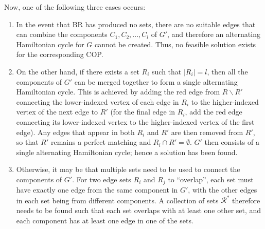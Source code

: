 \documentclass[runningheads]{llncs}
\begin{document}
Now, one of the following three cases occurs:
\begin{enumerate}
\item In the event that BR has produced no sets, there are no suitable edges that can combine the components $C_1, C_2, ..., C_l$ of $G'$, and therefore an alternating Hamiltonian cycle for $G$ cannot be created. Thus, no feasible solution exists for the corresponding COP.

\item On the other hand, if there exists a set $R_i$ such that $|R_i| = l$, then all the components of $G'$ can be merged together to form a single alternating Hamiltonian cycle. This is achieved by adding the red edge from $R\backslash R'$ connecting the lower-indexed vertex of each edge in $R_i$ to the higher-indexed vertex of the next edge to $R'$ (for the final edge in $R_i$, add the red edge connecting its lower-indexed vertex to the higher-indexed vertex of the first edge). Any edges that appear in both $R_i$ and $R'$ are then removed from $R'$, so that $R'$ remains a perfect matching and $R_i \cap R' = \emptyset$. $G'$ then consists of a single alternating Hamiltonian cycle; hence a solution has been found.

\item Otherwise, it may be that multiple sets need to be used to connect the components of $G'$. For two edge sets $R_i$ and $R_j$ to ``overlap'', each set must have exactly one edge from the same component in $G'$, with the other edges in each set being from different components. A collection of sets $\mathcal{R}^{*}$ therefore needs to be found such that each set overlaps with at least one other set, and each component has at least one edge in one of the sets.
\end{enumerate}
\end{document}
